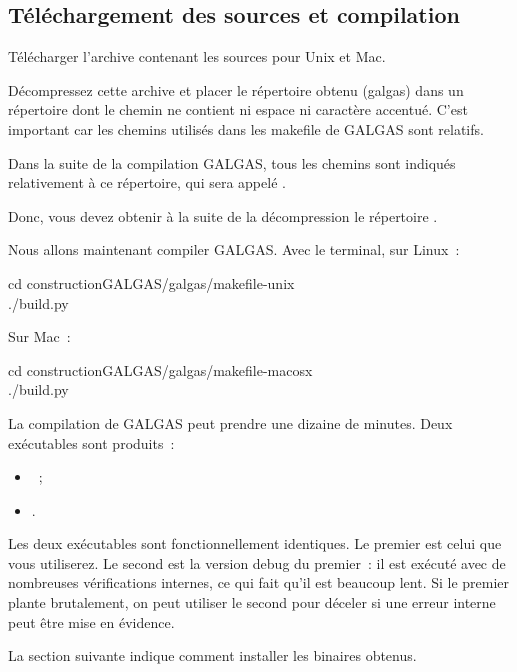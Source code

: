 \subsection{Téléchargement des sources et compilation}

Télécharger l’archive contenant les sources pour Unix et Mac.

Décompressez cette archive et placer le répertoire obtenu (galgas) dans un répertoire dont le chemin ne contient ni espace ni caractère accentué. C'est important car les chemins utilisés dans les makefile de GALGAS sont relatifs.

Dans la suite de la compilation GALGAS, tous les chemins sont indiqués relativement à ce répertoire, qui sera appelé .

Donc, vous devez obtenir à la suite de la décompression le répertoire .

Nous allons maintenant compiler GALGAS. Avec le terminal, sur Linux~:
\begin{SHELL}
cd constructionGALGAS/galgas/makefile-unix\\
./build.py
\end{SHELL}

Sur Mac~:
\begin{SHELL}
cd constructionGALGAS/galgas/makefile-macosx\\
./build.py
\end{SHELL}

La compilation de GALGAS peut prendre une dizaine de minutes. Deux exécutables sont produits~:

\begin{itemize}
  \item {}~;
  \item {}.
\end{itemize}

Les deux exécutables sont fonctionnellement identiques. Le premier est celui que vous utiliserez. Le second est la version debug du premier~: il est exécuté avec de nombreuses vérifications internes, ce qui fait qu’il est beaucoup lent. Si le premier plante brutalement, on peut utiliser le second pour déceler si une erreur interne peut être mise en évidence.

La section suivante indique comment installer les binaires obtenus.




